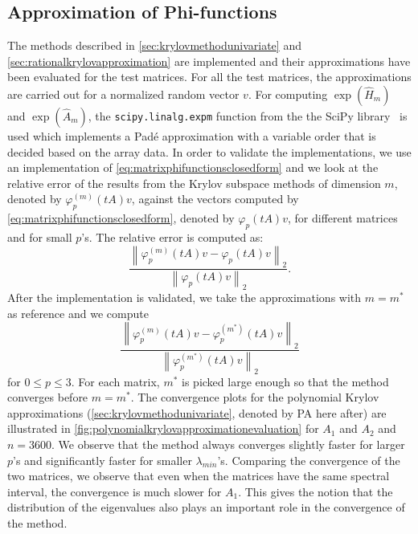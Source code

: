 \subsection{Approximation of Phi-functions}
The methods described in \autoref{sec:krylovmethodunivariate} and \autoref{sec:rationalkrylovapproximation}
are implemented and their approximations have been evaluated for the test matrices. For all the test matrices,
the approximations are carried out for a normalized random vector $v$.
For computing $\exp(\hat{H}_m)$ and $\exp(\hat{A}_m)$, the \texttt{scipy.linalg.expm} function from the the
SciPy library~\cite{SciPy2020} is used which implements a Padé approximation with a variable order that is
decided based on the array data.
In order to validate the implementations, we use an implementation of \eqref{eq:matrixphifunctionsclosedform}
and we look at the relative error of the results from the Krylov subspace methods of dimension $m$, denoted by
$\varphi_p^{(m)}(tA)v$, against the vectors computed by \eqref{eq:matrixphifunctionsclosedform},
denoted by $\varphi_p(tA)v$, for different matrices and for small $p$'s. The relative error is computed as:
\begin{equation*}
    \frac{\left\| \varphi_p^{(m)}(tA)v - \varphi_p(tA)v \right\|_2}{\left\| \varphi_p(tA)v\right\|_2}.
\end{equation*}
After the implementation is validated, we take the approximations with $m=m^*$ as reference and we compute
\begin{equation*}
    \frac{\left\| \varphi_p^{(m)}(tA)v - \varphi_p^{(m^*)}(tA)v \right\|_2}{\left\| \varphi_p^{(m^*)}(tA)v\right\|_2}
\end{equation*}
for $0 \le p \le 3$. For each matrix, $m^*$ is picked large enough so that the method converges before $m=m^*$.
The convergence plots for the polynomial Krylov approximations (\autoref{sec:krylovmethodunivariate}, denoted by
PA here after) are illustrated in \autoref{fig:polynomialkrylovapproximationevaluation} for $A_1$ and $A_2$ and $n=3600$.
We observe that the method always converges slightly faster for larger $p$'s and significantly faster for smaller
$\lambda_{min}$'s. Comparing the convergence of the two matrices, we observe that even when the matrices have the
same spectral interval, the convergence is much slower for $A_1$. This gives the notion that the distribution of
the eigenvalues also plays an important role in the convergence of the method.

